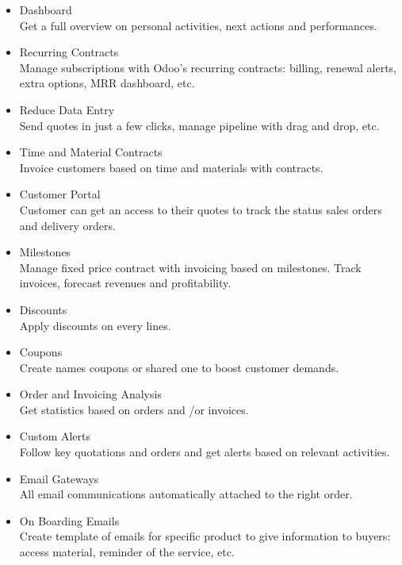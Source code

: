 \begin{itemize}
	\item Dashboard \\
	Get a full overview on personal activities, next actions and performances.
	
	\item Recurring Contracts \\
	Manage subscriptions with Odoo's recurring contracts: billing, renewal alerts, extra options, MRR dashboard, etc.
	
	\item Reduce Data Entry \\
	Send quotes in just a few clicks, manage pipeline with drag and drop, etc.
	
	\item Time and Material Contracts \\
	Invoice customers based on time and materials with contracts.
	
	\item Customer Portal \\
	Customer can get an access to their quotes to track the status sales orders and delivery orders.
	
	\item Milestones \\
	Manage fixed price contract with invoicing based on milestones. Track invoices, forecast revenues and profitability.
	
	\item Discounts \\
	Apply discounts on every lines.
	
	\item Coupons \\
	Create names coupons or shared one to boost customer demands.
	
	\item Order and Invoicing Analysis \\
	Get statistics based on orders and \slash or invoices.
	
	\item Custom Alerts \\
	Follow key quotations and orders and get alerts based on relevant activities.
	
	\item Email Gateways \\
	All email communications automatically attached to the right order.
	
	\item On Boarding Emails \\
	Create template of emails for specific product to give information to buyers: access material, reminder of the service, etc.
	

\end{itemize}
